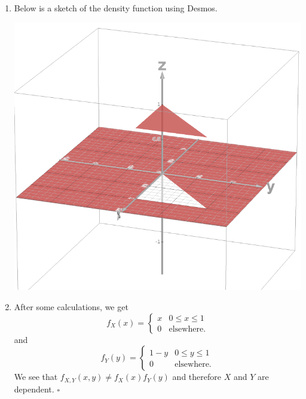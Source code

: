 \begin{problem}
    \begin{enumerate}[label=\alph*)]
        \item Below is a sketch of the density function using Desmos.
            \begin{center}
            \includegraphics[scale=0.3]{figure1.png}
            \end{center}
        \item After some calculations, we get
            \[
                f_X (x) = \left\lbrace \begin{matrix} x & 0 \leq x \leq 1 \\ 0 & \text{elsewhere.} \end{matrix} \right.
            \]
        and
            \[
                f_Y (y) = \left\lbrace \begin{matrix} 1 - y & 0 \leq y \leq 1 \\ 0 & \text{elsewhere.} \end{matrix} \right. 
            \]
        We see that $f_{X, Y} (x, y) \neq f_X (x) f_Y (y)$ and therefore $X$ and $Y$ are dependent. \hfill $\square$
    \end{enumerate}
\end{problem}

